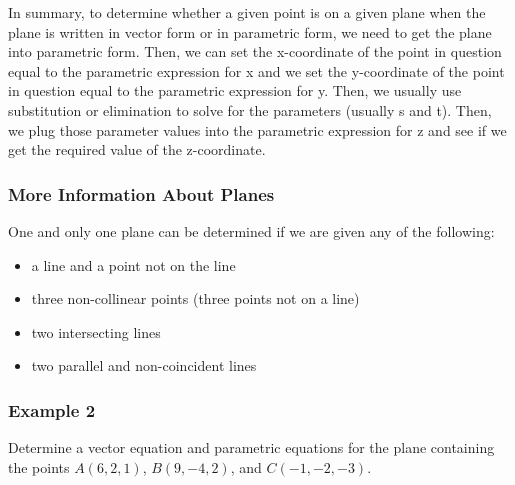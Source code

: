 \documentclass{article}
\begin{document}
In summary, to determine whether a given point is on a given plane when the plane is written in vector form or in parametric form, we need to get the plane into parametric form. Then, we can set the x-coordinate of the point in question equal to the parametric expression for x and we set the y-coordinate of the point in question equal to the parametric expression for y. Then, we usually use substitution or elimination to solve for the parameters (usually s and t). Then, we plug those parameter values into the parametric expression for z and see if we get the required value of the z-coordinate.

\subsubsection{More Information About Planes}
One and only one plane can be determined if we are given any of the following:
\begin{itemize}
    \item a line and a point not on the line
    \item three non-collinear points (three points not on a line)
    \item two intersecting lines
    \item two parallel and non-coincident lines
\end{itemize}
\subsubsection*{Example 2}
Determine a vector equation and parametric equations for the plane containing the points \(A (6, 2, 1)\), \(B (9, -4, 2)\), and \(C (-1, -2, -3)\).
\end{document}
